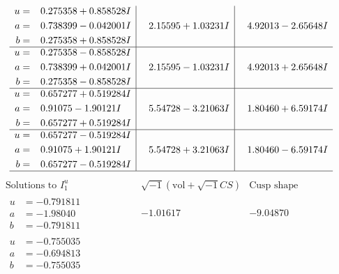\documentclass[1p]{elsarticle_modified}
\theoremstyle{definition}
\newcommand{\I}{\sqrt{-1}}
\begin{document}
$$\begin{array}{c|c|c}
\begin{aligned}
u &= \phantom{-}0.275358 + 0.858528 I \\
a &= \phantom{-}0.738399 - 0.042001 I \\
b &= \phantom{-}0.275358 + 0.858528 I\end{aligned}
 & \phantom{-}2.15595 + 1.03231 I & \phantom{-}4.92013 - 2.65648 I \\ \hline\begin{aligned}
u &= \phantom{-}0.275358 - 0.858528 I \\
a &= \phantom{-}0.738399 + 0.042001 I \\
b &= \phantom{-}0.275358 - 0.858528 I\end{aligned}
 & \phantom{-}2.15595 - 1.03231 I & \phantom{-}4.92013 + 2.65648 I \\ \hline\begin{aligned}
u &= \phantom{-}0.657277 + 0.519284 I \\
a &= \phantom{-}0.91075 - 1.90121 I \\
b &= \phantom{-}0.657277 + 0.519284 I\end{aligned}
 & \phantom{-}5.54728 - 3.21063 I & \phantom{-}1.80460 + 6.59174 I \\ \hline\begin{aligned}
u &= \phantom{-}0.657277 - 0.519284 I \\
a &= \phantom{-}0.91075 + 1.90121 I \\
b &= \phantom{-}0.657277 - 0.519284 I\end{aligned}
 & \phantom{-}5.54728 + 3.21063 I & \phantom{-}1.80460 - 6.59174 I\\
 \hline 
 \end{array}$$\newpage$$\begin{array}{c|c|c}  
\text{Solutions to }I^u_{1}& \I (\text{vol} + \sqrt{-1}CS) & \text{Cusp shape}\\
 \hline 
\begin{aligned}
u &= -0.791811\phantom{ +0.000000I} \\
a &= -1.98040\phantom{ +0.000000I} \\
b &= -0.791811\phantom{ +0.000000I}\end{aligned}
 & -1.01617\phantom{ +0.000000I} & -9.04870\phantom{ +0.000000I} \\ \hline\begin{aligned}
u &= -0.755035\phantom{ +0.000000I} \\
a &= -0.694813\phantom{ +0.000000I} \\
b &= -0.755035\phantom{ +0.000000I}\end{aligned}

\end{array}$$
\end{document}
